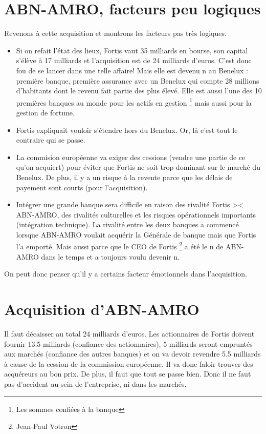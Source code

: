 \section{ABN-AMRO, facteurs peu logiques}
Revenons à cette acquisition et montrons les facteurs pas très logiques. 
\begin{itemize}
	\item Si on refait l'état des lieux, Fortis vaut 35 milliards en bourse, son capital s'élève à 17 milliards et l'acquisition est de 24 milliards d'euros. C'est donc fou de se lancer dans une telle affaire! Mais elle est devenu n au Benelux : première banque, première assurance avec un Benelux qui compte 28 millions d'habitants dont le revenu fait partie des plus élevé. Elle est aussi l'une des 10 premières banques au monde pour les actifs en gestion \footnote{Les sommes confiées à la banque} mais aussi pour la gestion de fortune. 
	      
	\item Fortis expliquait vouloir s'étendre hors du Benelux. Or, là c'est tout le contraire qui se passe.
	      
	\item La commision européenne va exiger des cessions (vendre une partie de ce qu'on acquiert) pour éviter que Fortis ne soit trop dominant sur le marché du Benelux. De plus, il y a un risque à la revente parce que les délais de payement sont courts (pour l'acquisition).
	      
	\item Intégrer une grande banque sera difficile en raison des rivalité Fortis >< ABN-AMRO, des rivalités culturelles et les risques opérationnels importants (intégration technique). La rivalité entre les deux banques a commencé lorsque ABN-AMRO voulait acquérir la Générale de banque mais que Fortis l'a emporté. Mais aussi parce que le CEO de Fortis \footnote{Jean-Paul Votron} a été le n de ABN-AMRO dans le temps et a toujours voulu devenir n.
\end{itemize}
On peut donc penser qu'il y a certains facteur émotionnels dans l'acquisition. 

\section{Acquisition d'ABN-AMRO}
Il faut décaisser au total 24 milliards d'euros. Les actionnaires de Fortis doivent fournir 13.5 milliards (confiance des actionnaires), 5 milliards seront empruntés aux marchés (confiance des autres banques) et on va devoir revendre 5.5 milliards à cause de la cession de la commission européenne. Il va donc faloir trouver des acquéreurs au bon prix. De plus, il faut que tout se passe bien. Donc il ne faut pas d'accident au sein de l'entreprise, ni dans les marchés. \\

